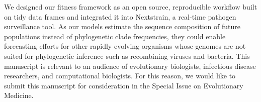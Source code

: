 \documentclass[stdletter,letterpaper,addrfromright,orderfromdateto,dateleft,11pt,noaddrto,sigleft]{newlfm}
\begin{document}
\begin{newlfm}
  We designed our fitness framework as an open source, reproducible workflow built on tidy data frames and integrated it into Nextstrain, a real-time pathogen surveillance tool.
  As our models estimate the sequence composition of future populations instead of phylogenetic clade frequencies, they could enable forecasting efforts for other rapidly evolving organisms whose genomes are not suited for phylogenetic inference such as recombining viruses and bacteria.
  This manuscript is relevant to an audience of evolutionary biologists, infectious disease researchers, and computational biologists.
  For this reason, we would like to submit this manuscript for consideration in the Special Issue on Evolutionary Medicine.
\end{newlfm}
\end{document}
